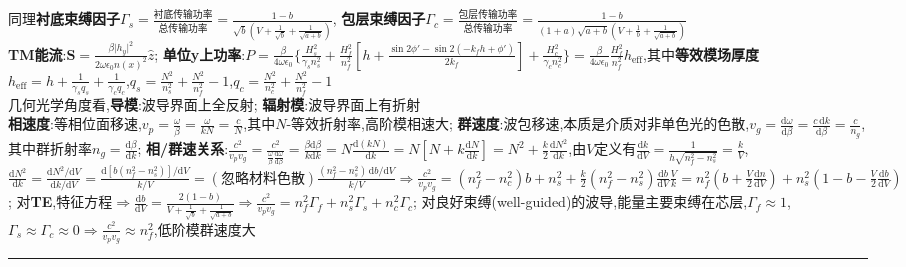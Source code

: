 \documentclass[a4paper,10pt]{article}
\providecommand{\abs}[1]{\lvert#1\rvert}
\begin{document}
\begin{multicols*}{2}
    同理\textbf{衬底束缚因子}$\Gamma_s=\frac{\text{衬底传输功率}}{\text{总传输功率}}=\frac{1-b}{\sqrt{b}(V+\frac{1}{\sqrt{b}}+\frac{1}{\sqrt{a+b}})}$,%
    \textbf{包层束缚因子}$\Gamma_c=\frac{\text{包层传输功率}}{\text{总传输功率}}=\frac{1-b}{(1+a)\sqrt{a+b}(V+\frac{1}{b}+\frac{1}{\sqrt{a+b}})}$\\
\textbf{TM能流}:$\bm{S}=\frac{\beta\abs{h_y}^2}{2\omega\epsilon_0n(x)^2}\hat{z}$;%
    \textbf{单位y上功率}:$P=\frac{\beta}{4\omega\epsilon_0}\{\frac{H_s^2}{\gamma_sn_s^2}+\frac{H_f^2}{n_f^2}[h+\frac{\sin 2\phi'-\sin 2(-k_fh+\phi')}{2k_f}]+\frac{H_c^2}{\gamma_cn_c^2}\}=\frac{\beta}{4\omega\epsilon_0}\frac{H_f^2}{n_f^2}h_{\text{eff}}$,其中\textbf{等效模场厚度}$h_{\text{eff}}=h+\frac{1}{\gamma_sq_s}+\frac{1}{\gamma_cq_c}$,$q_s=\frac{N^2}{n_s^2}+\frac{N^2}{n_f^2}-1$,$q_c=\frac{N^2}{n_c^2}+\frac{N^2}{n_f^2}-1$\\
几何光学角度看,\textbf{导模}:波导界面上全反射;%
    \textbf{辐射模}:波导界面上有折射\\
\textbf{相速度}:等相位面移速,$v_p=\frac{\omega}{\beta}=\frac{\omega}{kN}=\frac{c}{N}$,其中$N$-等效折射率,高阶模相速大;%
    \textbf{群速度}:波包移速,本质是介质对非单色光的色散,$v_g=\frac{\mathrm{d}\omega}{\mathrm{d}\beta}=\frac{c\,\mathrm{d}k}{\mathrm{d}\beta}=\frac{c}{n_g}$,其中群折射率$n_g=\frac{\mathrm{d}\beta}{\mathrm{d}k}$;%
    \textbf{相/群速关系}:$\frac{c^2}{v_pv_g}=\frac{c^2}{\frac{\omega}{\beta}\frac{\mathrm{d}\omega}{\mathrm{d}\beta}}=\frac{\beta\mathrm{d}\beta}{k\mathrm{d}k}=N\frac{\mathrm{d}(kN)}{\mathrm{d}k}=N[N+k\frac{\mathrm{d}N}{\mathrm{d}k}]=N^2+\frac{k}{2}\frac{\mathrm{d}N^2}{\mathrm{d}k}$,由$V$定义有$\frac{\mathrm{d}k}{\mathrm{d}V}=\frac{1}{h\sqrt{n_f^2-n_s^2}}=\frac{k}{V}$,$\frac{\mathrm{d}N^2}{\mathrm{d}k}=\frac{\mathrm{d}N^2/\mathrm{d}V}{\mathrm{d}k/\mathrm{d}V}=\frac{\mathrm{d}[b(n_f^2-n_s^2)]/\mathrm{d}V}{k/V}=(\text{忽略材料色散})\frac{(n_f^2-n_s^2)\,\mathrm{d}b/\mathrm{d}V}{k/V}\Rightarrow\frac{c^2}{v_pv_g}=(n_f^2-n_c^2)b+n_s^2+\frac{k}{2}(n_f^2-n_s^2)\frac{\mathrm{d}b}{\mathrm{d}V}\frac{V}{k}=n_f^2(b+\frac{V}{2}\frac{\mathrm{d}n}{\mathrm{d}V})+n_s^2(1-b-\frac{V}{2}\frac{\mathrm{d}b}{\mathrm{d}V})$;%
    对\textbf{TE},特征方程$\Rightarrow\frac{\mathrm{d}b}{\mathrm{d}V}=\frac{2(1-b)}{V+\frac{1}{\sqrt{b}}+\frac{1}{\sqrt{a+b}}}\Rightarrow\frac{c^2}{v_pv_g}=n_f^2\Gamma_f+n_s^2\Gamma_s+n_c^2\Gamma_c$;%
    对良好束缚(well-guided)的波导,能量主要束缚在芯层,$\Gamma_f\approx 1$,$\Gamma_s\approx\Gamma_c\approx 0\Rightarrow\frac{c^2}{v_pv_g}\approx n_f^2$,低阶模群速度大\\
\rule{\columnwidth}{.5pt}\\

\end{multicols*}
\end{document}
